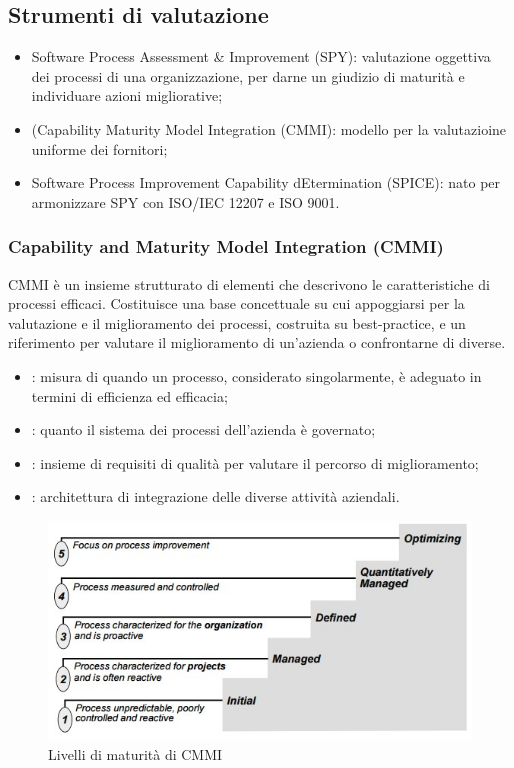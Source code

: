 \subsection{Strumenti di valutazione}
\label{sub:strumenti_di_valutazione}

\begin{itemize}
  \item Software Process Assessment \& Improvement (SPY): valutazione oggettiva
    dei processi di una organizzazione, per darne un giudizio di maturità e
    individuare azioni migliorative;
  \item (Capability Maturity Model Integration (CMMI): modello per la
    valutazioine uniforme dei fornitori;
  \item Software Process Improvement Capability dEtermination (SPICE): nato per
    armonizzare SPY con ISO/IEC 12207 e ISO 9001.
\end{itemize}

\subsubsection{Capability and Maturity Model Integration (CMMI)}
\label{ssub:capability_and_maturity_model_integration}

CMMI è un insieme strutturato di elementi che descrivono le caratteristiche di
processi efficaci. Costituisce una base concettuale su cui appoggiarsi per la
valutazione e il miglioramento dei processi, costruita su best-practice, e un
riferimento per valutare il miglioramento di un'azienda o confrontarne di
diverse.

\begin{itemize}
  \item {}: misura di quando un processo, considerato
    singolarmente, è adeguato in termini di efficienza ed efficacia;
  \item {}: quanto il sistema dei processi dell'azienda è
    governato;
  \item {}: insieme di requisiti di qualità per valutare il percorso
    di miglioramento;
  \item {}: architettura di integrazione delle diverse
    attività aziendali.
\end{itemize}

\begin{figure}[h!]
  \centering
  \includegraphics[scale=0.5]{imgs/cmmi_maturity_level}
  \caption{Livelli di maturità di CMMI}
\end{figure}

